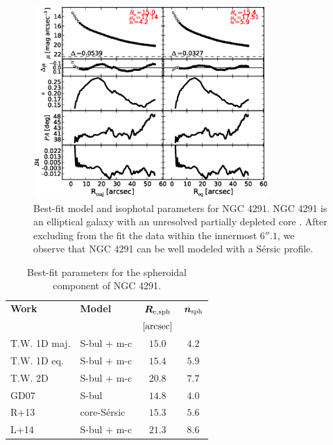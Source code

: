 \documentclass[preprint2]{emulateapj}
\newcommand{\fitfigurewidth}{0.8\textwidth}
\begin{document}
  \begin{figure}[h]
  \begin{center}
  \includegraphics[width=\fitfigurewidth]{images/n4291_1Dfit.eps}
  \caption{Best-fit model and isophotal parameters for NGC 4291.
  NGC 4291 is an elliptical galaxy with an unresolved partially depleted core \citep{rusli2013}. %
  After excluding from the fit the data within the innermost $6''.1$, 
  we observe that NGC 4291 can be well modeled with a S\'ersic profile.
  }
  \end{center}
  \end{figure}

  \begin{table}[h]
  \small
  \caption{Best-fit parameters for the spheroidal component of NGC 4291.}
  \begin{center}
  \begin{tabular}{llcc}
  \hline
  {\bf Work} & {\bf Model}   & $\bm R_{\rm e,sph}$    & $\bm n_{\rm sph}$ \\
    &  &  $[\rm arcsec]$ & \\
  \hline
  T.W. 1D maj. & S-bul + m-c & $15.0$  &  $4.2$ \\
  T.W. 1D eq.  & S-bul + m-c & $15.4$  &  $5.9$ \\
  T.W. 2D      & S-bul + m-c & $20.8$  &  $7.7$ \\
  \hline
  GD07         & S-bul         & $14.8$  &  $4.0$ \\
  R+13         & core-S\'ersic & $15.3$  &  $5.6$ \\
  L+14         & S-bul + m-c   & $21.3$  &  $8.6$ \\
  \hline
  \end{tabular}
  \end{center}
  \label{tab:n4291}
  \end{table}
\end{document}
